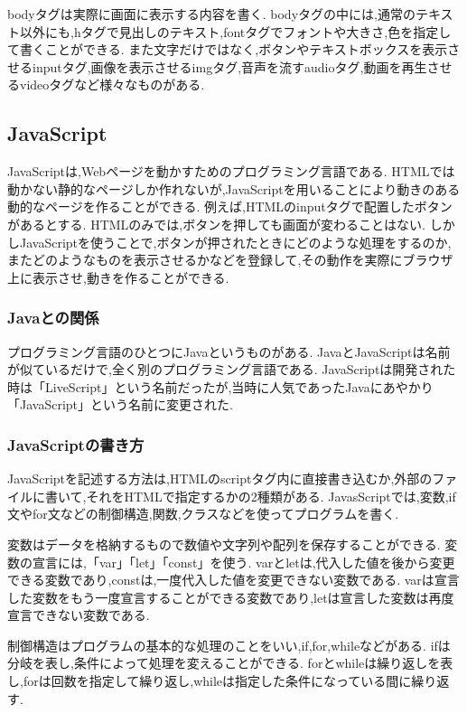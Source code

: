 \documentclass[12pt,a4j,titlepage]{ltjsarticle}
\begin{document}
bodyタグは実際に画面に表示する内容を書く.
bodyタグの中には,通常のテキスト以外にも,hタグで見出しのテキスト,fontタグでフォントや大きさ,色を指定して書くことができる.
また文字だけではなく,ボタンやテキストボックスを表示させるinputタグ,画像を表示させるimgタグ,音声を流すaudioタグ,動画を再生させるvideoタグなど様々なものがある.

\newpage
\subsection{JavaScript}
JavaScriptは,Webページを動かすためのプログラミング言語である.
HTMLでは動かない静的なページしか作れないが,JavaScriptを用いることにより動きのある動的なページを作ることができる.
例えば,HTMLのinputタグで配置したボタンがあるとする.
HTMLのみでは,ボタンを押しても画面が変わることはない.
しかしJavaScriptを使うことで,ボタンが押されたときにどのような処理をするのか,またどのようなものを表示させるかなどを登録して,その動作を実際にブラウザ上に表示させ,動きを作ることができる.

\subsubsection{Javaとの関係}
プログラミング言語のひとつにJavaというものがある.
JavaとJavaScriptは名前が似ているだけで,全く別のプログラミング言語である.
JavaScriptは開発された時は「LiveScript」という名前だったが,当時に人気であったJavaにあやかり「JavaScript」という名前に変更された.

\subsubsection{JavaScriptの書き方}
JavaScriptを記述する方法は,HTMLのscriptタグ内に直接書き込むか,外部のファイルに書いて,それをHTMLで指定するかの2種類がある.
JavasScriptでは,変数,if文やfor文などの制御構造,関数,クラスなどを使ってプログラムを書く.

変数はデータを格納するもので数値や文字列や配列を保存することができる.
変数の宣言には,「var」「let」「const」を使う.
varとletは,代入した値を後から変更できる変数であり,constは,一度代入した値を変更できない変数である.
varは宣言した変数をもう一度宣言することができる変数であり,letは宣言した変数は再度宣言できない変数である.

制御構造はプログラムの基本的な処理のことをいい,if,for,whileなどがある.
ifは分岐を表し,条件によって処理を変えることができる.
forとwhileは繰り返しを表し,forは回数を指定して繰り返し,whileは指定した条件になっている間に繰り返す.
\end{document}
